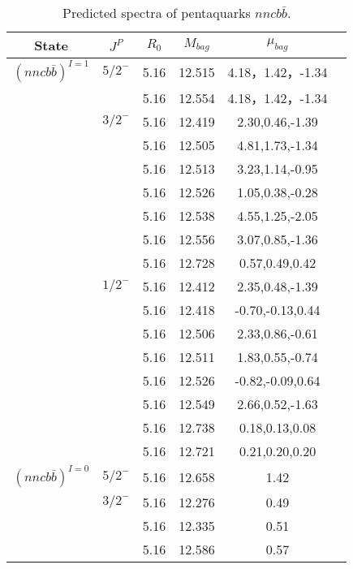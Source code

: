 \documentclass[prd,twocolumn,floatfix,nofootinbib]{revtex4}
\begin{document}
\begin{table*}[!htbp]
    \caption{Predicted spectra of pentaquarks $nncb\bar{b}$.}
    \begin{tabular}{cccccc}
        \hline\hline
        {\rm State} &$J^{P}$ &$R_{0}$ &$M_{bag}$ &$\mu_{bag}$  \\ \hline
        ${(nncb\bar{b})}^{I=1}$
            &${5/2}^{-}$     &5.16   &12.515 &4.18，1.42，-1.34  \\    
                         &$ $     &5.16   &12.554 &4.18，1.42，-1.34  \\            
            &${3/2}^{-}$     &5.16   &12.419 &2.30,0.46,-1.39    \\
                         &$ $     &5.16   &12.505 &4.81,1.73,-1.34  \\
                         &$ $     &5.16   &12.513 &3.23,1.14,-0.95  \\
                         &$ $     &5.16   &12.526 &1.05,0.38,-0.28 \\
                         &$ $     &5.16   &12.538 &4.55,1.25,-2.05 \\
                         &$ $     &5.16   &12.556 &3.07,0.85,-1.36 \\
                         &$ $     &5.16   &12.728 &0.57,0.49,0.42  \\
            &${1/2}^{-}$     &5.16   &12.412 &2.35,0.48,-1.39  \\
                         &$ $     &5.16   &12.418 &-0.70,-0.13,0.44  \\
                         &$ $     &5.16   &12.506 &2.33,0.86,-0.61  \\
                         &$ $     &5.16   &12.511 &1.83,0.55,-0.74 \\
                         &$ $     &5.16   &12.526 &-0.82,-0.09,0.64 \\
                         &$ $     &5.16   &12.549 &2.66,0.52,-1.63\\
                         &$ $     &5.16   &12.738 &0.18,0.13,0.08\\
                         &$ $     &5.16   &12.721 &0.21,0.20,0.20\\      
            ${(nncb\bar{b})}^{I=0}$
            &${5/2}^{-}$     &5.16   &12.658 &1.42  \\                
            &${3/2}^{-}$     &5.16   &12.276 &0.49 \\
                         &$ $     &5.16   &12.335 &0.51  \\
                         &$ $     &5.16   &12.586 &0.57  \\

\end{tabular}
\end{table*}
\end{document}
